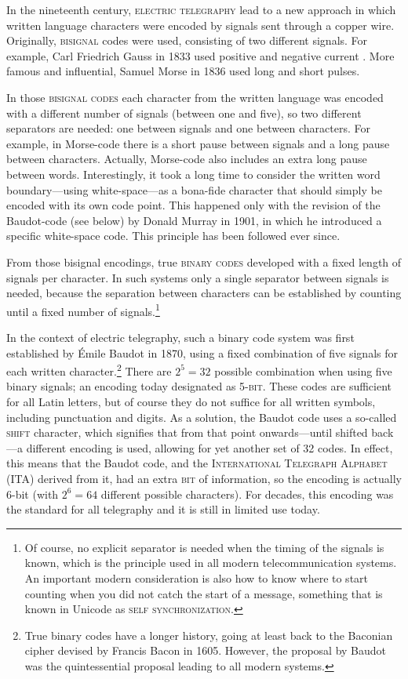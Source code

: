 In the nineteenth century, \textsc{electric telegraphy} lead to a new approach
in which written language characters were encoded by signals sent through a
copper wire. Originally, \textsc{bisignal} codes were used, consisting of two
different signals. For example, Carl Friedrich Gauss in 1833 used positive and
negative current \citep[282]{Mania2008}. More famous and influential, Samuel
Morse in 1836 used long and short pulses.

In those \textsc{bisignal codes} each character from the written language was
encoded with a different number of signals (between one and five), so two
different separators are needed: one between signals and one between characters.
For example, in Morse-code there is a short pause between signals and a long
pause between characters. Actually, Morse-code also includes an extra long pause
between words. Interestingly, it took a long time to consider the written word
boundary---using white-space---as a bona-fide character that should simply be
encoded with its own code point. This happened only with the revision of the
Baudot-code (see below) by Donald Murray in 1901, in which he introduced a
specific white-space code. This principle has been followed ever since.

From those bisignal encodings, true \textsc{binary codes} developed with a fixed
length of signals per character. In such systems only a single separator between
signals is needed, because the separation between characters can be established
by counting until a fixed number of signals.\footnote{Of course, no explicit
separator is needed when the timing of the signals is known, which is the
principle used in all modern telecommunication systems. An important modern
consideration is also how to know where to start counting when you did not catch
the start of a message, something that is known in Unicode as \textsc{self
synchronization}.}

In the context of electric telegraphy, such a binary code system was first
established by Émile Baudot in 1870, using a fixed combination of five signals
for each written character.\footnote{True binary codes have a longer history,
going at least back to the Baconian cipher devised by Francis Bacon in 1605.
However, the proposal by Baudot was the quintessential proposal leading to all
modern systems.} There are $2^5 = 32$ possible combination when using five
binary signals; an encoding today designated as \textsc{5-bit}. These codes are
sufficient for all Latin letters, but of course they do not suffice for all
written symbols, including punctuation and digits. As a solution, the Baudot
code uses a so-called \textsc{shift} character, which signifies that from that
point onwards---until shifted back---a different encoding is used, allowing for
yet another set of 32 codes. In effect, this means that the Baudot code, and the
\textsc{International Telegraph Alphabet} (ITA) derived from it, had an extra
\textsc{bit} of information, so the encoding is actually 6-bit (with $2^6 = 64$
different possible characters). For decades, this encoding was the standard for
all telegraphy and it is still in limited use today.

